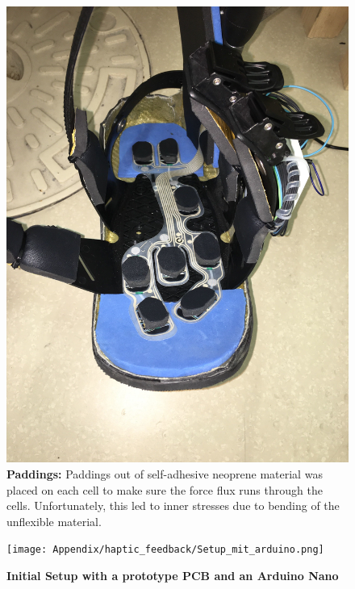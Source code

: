 \begin{figure}[!t]
	\centering
	\includegraphics[width=1\columnwidth]{Appendix/haptic_feedback/Aussensohle.JPG}
	\caption{\textbf{Paddings:} Paddings out of self-adhesive neoprene material was placed on each cell to make sure the force flux runs through the cells. Unfortunately, this led to inner stresses due to bending of the unflexible material.}
	\label{fig: paddings}
\end{figure}


\begin{figure}[!t]
	\centering
	\texttt{[image: Appendix/haptic\_feedback/Setup\_mit\_arduino.png]}
	\caption{\textbf{Initial Setup with a prototype PCB and an Arduino Nano }}
	\label{fig: Arduino Nano}
\end{figure}


